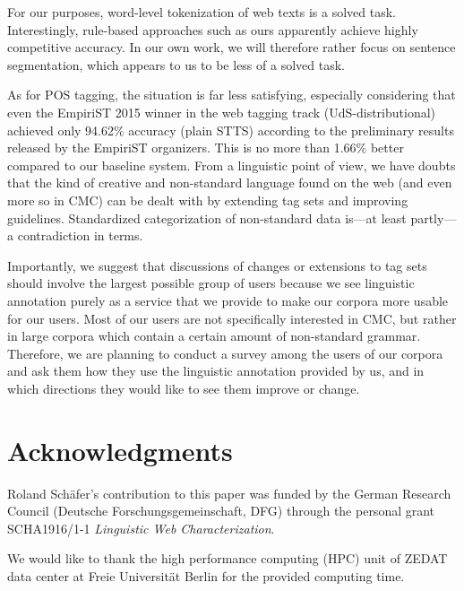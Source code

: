 \documentclass[11pt]{article}
\begin{document}
For our purposes, word-level tokenization of web texts is a solved task.
Interestingly, rule-based approaches such as ours apparently achieve highly competitive accuracy.
In our own work, we will therefore rather focus on sentence segmentation, which appears to us to be less of a solved task.

As for POS tagging, the situation is far less satisfying, especially considering that even the EmpiriST 2015 winner in the web tagging track (UdS-distributional) achieved only 94.62\% accuracy (plain STTS) according to the preliminary results released by the EmpiriST organizers.
This is no more than 1.66\% better compared to our baseline system.
From a linguistic point of view, we have doubts that the kind of creative and non-standard language found on the web (and even more so in CMC) can be dealt with by extending tag sets and improving guidelines.
Standardized categorization of non-standard data is---at least partly---a contradiction in terms.

Importantly, we suggest that discussions of changes or extensions to tag sets should involve the largest possible group of users because we see linguistic annotation purely as a service that we provide to make our corpora more usable for our users.
Most of our users are not specifically interested in CMC, but rather in large corpora which contain a certain amount of non-standard grammar.
Therefore, we are planning to conduct a survey among the users of our corpora and ask them how they use the linguistic annotation provided by us, and in which directions they would like to see them improve or change.

\section*{Acknowledgments}

Roland Schäfer's contribution to this paper was funded by the German Research Council (Deutsche Forschungsgemeinschaft, DFG) through the personal grant SCHA1916/1-1 \textit{Linguistic Web Characterization}.

We would like to thank the high performance computing (HPC) unit of ZEDAT data center at Freie Universität Berlin for the provided computing time.




\end{document}
